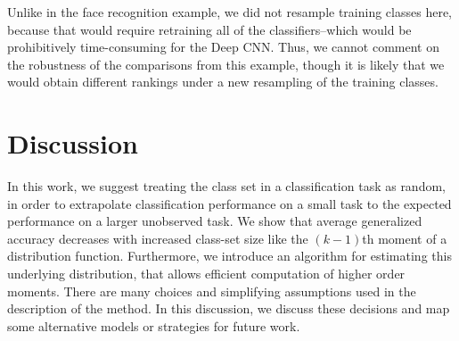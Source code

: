 \documentclass[twoside,11pt]{article}
\begin{document}
Unlike in the face recognition example, we did not resample training classes here, because that would require retraining all of the classifiers--which would be prohibitively time-consuming for the Deep CNN.  Thus, we cannot comment on the robustness of the comparisons from this example, though it is likely that we would obtain different rankings under a new resampling of the training classes.

\section{Discussion}
\label{sec:discussion}
In this work, we suggest treating the class set in a classification
task as random, in order to extrapolate classification performance on
a small task to the expected performance on a larger unobserved task.
We show that average generalized accuracy decreases with increased
class-set size like the $(k-1)$th moment of a distribution function.
Furthermore, we introduce an algorithm for estimating this underlying
distribution, that allows efficient computation of higher order
moments.  There are many choices and simplifying assumptions used in
the description of the method.  In this discussion, we discuss these
decisions and map some alternative models or strategies for future
work.
\end{document}

